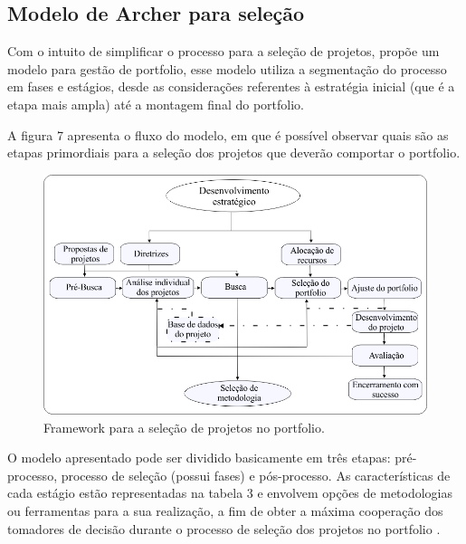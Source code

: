 \documentclass[12pt,a4paper,ruledheader,tocpage=prefix,floatnumber=continuous,pagestart=folhaderosto,font=times]{abnt}
\begin{document}
\subsection{Modelo de Archer para seleção}
Com o intuito de simplificar o processo para a seleção de projetos, \cite{ARCHER1999} propõe um modelo para gestão de portfolio, esse modelo utiliza a 
segmentação do processo em fases e estágios, desde as considerações referentes à estratégia inicial (que é a etapa mais ampla) até a montagem final do 
portfolio.

A figura 7 apresenta o fluxo do modelo, em que é possível observar quais são as etapas primordiais para a seleção dos projetos que deverão comportar
o portfolio.

\begin{figure}[H]
\centering
\includegraphics[width=.7\textwidth]{img/fig7.png}
\caption{Framework para a seleção de projetos no portfolio\cite{ARCHER1999}.}
\end{figure}

O modelo apresentado pode ser dividido basicamente em três etapas: pré-processo, processo de seleção (possui fases) e pós-processo. As características 
de cada estágio estão representadas na tabela 3 e envolvem opções de metodologias ou ferramentas para a sua realização, a fim de obter a máxima 
cooperação dos tomadores de decisão durante o processo de seleção dos projetos no portfolio \cite{ARCHER1999}. 
\end{document}
